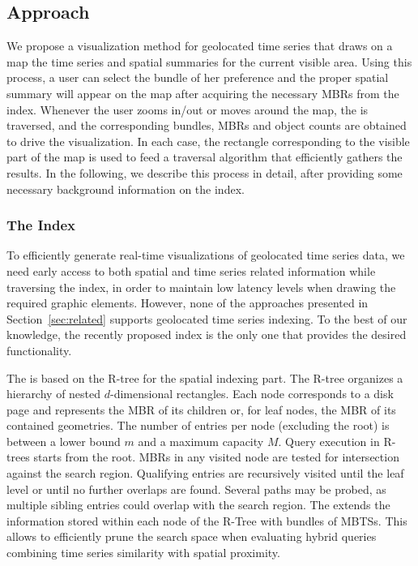 \subsection{Approach}
\label{sec:approach}

We propose a visualization method for geolocated time series that draws on a map the time series and spatial summaries for the current visible area. Using this process, a user can select the bundle of her preference and the proper spatial summary will appear on the map after acquiring the necessary MBRs from the \btsr index. Whenever the user zooms in/out or moves around the map, the \btsr is traversed, and the corresponding bundles, MBRs and object counts are obtained to drive the visualization. In each case, the rectangle corresponding to the visible part of the map is used to feed a traversal algorithm that efficiently gathers the results. In the following, we describe this process in detail, after providing some necessary background information on the \btsr index.

\subsubsection{The \btsr Index}
\label{subsec:btsr}

To efficiently generate real-time visualizations of geolocated time series data, we need early access to both spatial and time series related information while traversing the index, in order to maintain low latency levels when drawing the required graphic elements. However, none of the approaches presented in Section~\ref{sec:related} supports geolocated time series indexing. To the best of our knowledge, the recently proposed \btsr index \cite{chatzig17btsr} is the only one that provides the desired functionality. 

The \btsr is based on the R-tree \cite{Guttman1984} for the spatial indexing part. The R-tree organizes a hierarchy of nested $d$-dimensional rectangles. Each node corresponds to a disk page and represents the MBR of its children or, for leaf nodes, the MBR of its contained geometries. The number of entries per node (excluding the root) is between a lower bound $m$ and a maximum capacity $M$. Query execution in R-trees starts from the root. MBRs in any visited node are tested for intersection against the search region. Qualifying entries are recursively visited until the leaf level or until no further overlaps are found. Several paths may be probed, as multiple sibling entries could overlap with the search region. The \btsr extends the information stored within each node of the R-Tree with bundles of MBTSs. This allows to efficiently prune the search space when evaluating hybrid queries combining time series similarity with spatial proximity.


